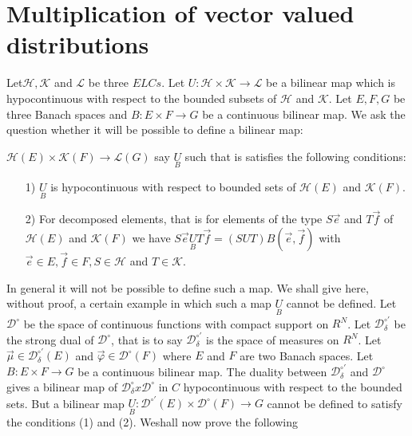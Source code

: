 
\chapter{Multiplication of vector valued distributions}\label{chap14}

Let\pageoriginale $\mathscr{H}, \mathscr{K}$ and $\mathscr{L}$ be
three $E L Cs$. Let $U : \mathscr{H} \times \mathscr{K} \to
\mathscr{L}$ be a bilinear map which is hypocontinuous with respect to
the bounded subsets of $\mathscr{H}$ and $\mathscr{K}$. Let $E, F, G$
be three Banach spaces and $B : E \times F \to G$ be a continuous
bilinear map. We ask the question whether it will be possible to
define a bilinear map:

$\mathscr{H}(E) \times \mathscr{K}(F) \to \mathscr{L}(G)$ say
$\underset{B}{U}$ such that is satisfies the following conditions:
\begin{enumerate}
\item [1)] $\underset{B}{U}$ is hypocontinuous with respect to bounded
 sets of $\mathscr{H}(E)$ and $\mathscr{K}(F)$.
\item [2)] For decomposed elements, that is for elements of the type
  $S\overrightarrow{e}$ and $T \overrightarrow{f}$ of $\mathscr{H}(E)$
  and $\mathscr{K}(F)$ we have $S \overrightarrow{e} \underset{B}{U} T
  \overrightarrow{f} = (S U T) B(\overrightarrow{e},
  \overrightarrow{f})$ with $\overrightarrow{e} \in E,
  \overrightarrow{f} \in F, S \in \mathscr{H}$ and $T \in
  \mathscr{K}$.  
\end{enumerate}

In general it will not be possible to define such a map. We shall give
here, without proof, a certain example in which such a map
$\underset{B}{U}$ cannot be defined. Let $\mathscr{D}^\circ$ be the
space of continuous functions with compact support on $R^N$. Let
$\mathscr{D}_\delta^{\circ'}$ be the strong dual of
$\mathscr{D}^\circ$, that is to say $\mathscr{D}_\delta^{\circ'}$ is
the space of measures on $R^N$. Let $\overrightarrow{\mu} \in
\mathscr{D}_\delta^{\circ'}(E)$ and $\overrightarrow{\varphi} \in
\mathscr{D}^\circ (F)$ where $E$ and $F$ are two Banach spaces. Let $B
: E \times F \to G$ be a continuous bilinear map. The duality between
$\mathscr{D}_\delta^{\circ'}$ and $\mathscr{D}^\circ$ gives a bilinear
map of $\mathscr{D}_\delta^\circ x \mathscr{D}^\circ$ in $C$
hypocontinuous with respect to the bounded sets. But a bilinear map
$\underset{B}{U} : \mathscr{D}^{\circ'} (E) \times \mathscr{D}^\circ
(F) \to G$ cannot be defined to satisfy the conditions (1) and
(2). We\pageoriginale shall now prove the following

